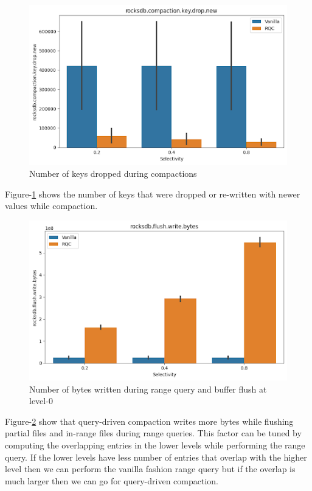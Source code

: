 \begin{figure}
    \includegraphics[scale=0.45]{Figures/Keys Drop In Compactions.png}
    \caption{Number of keys dropped during compactions}\label{fig:keys_drop_in_compactions}
\end{figure}

Figure-\ref{fig:keys_drop_in_compactions} shows the number of keys that were dropped or re-written with newer values while compaction.

\begin{figure}
    \includegraphics[scale=0.45]{Figures/Range Query Flush Write Bytes.png}
    \caption{Number of bytes written during range query and buffer flush at level-0}\label{fig:range_query_flush_write_bytes}
\end{figure}

Figure-\ref{fig:range_query_flush_write_bytes} show that query-driven compaction writes more bytes while flushing partial files and in-range files during 
range queries. This factor can be tuned by computing the overlapping entries in the lower levels while performing the 
range query. If the lower levels have less number of entries that overlap with the higher level then we can perform the 
vanilla fashion range query but if the overlap is much larger then we can go for query-driven compaction.